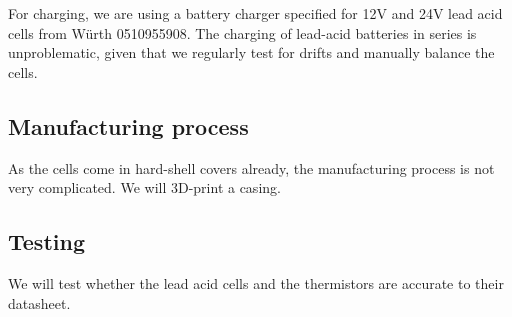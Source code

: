 For charging, we are using a battery charger specified for 12V and 24V lead acid cells from Würth 0510955908. The charging of lead-acid batteries in series is unproblematic, given that we regularly test for drifts and manually balance the cells.

\subsection{Manufacturing process}
As the cells come in hard-shell covers already, the manufacturing process is not very complicated. We will 3D-print a casing.

\subsection{Testing}
We will test whether the lead acid cells and the thermistors are accurate to their datasheet.
